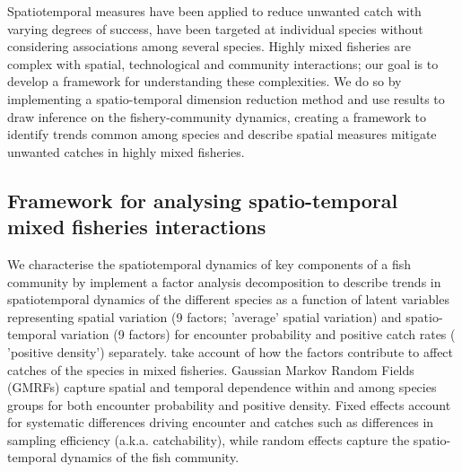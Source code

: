 \documentclass{nature}
\begin{document}
\begin{linenumbers}
Spatiotemporal measures have been applied to reduce unwanted catch with
varying degrees of success\cite{Needle2011, Dunn2014a},   have
been targeted at individual species without considering
associations among several species. Highly mixed
fisheries are complex with spatial, technological and community
interactions;  our goal is to develop a framework for
understanding these complexities. We do so by implementing a spatio-temporal
dimension reduction method and use  results to draw inference on
the fishery-community dynamics, creating a framework to identify trends common
among species  and describe  spatial measures
 mitigate unwanted
catches in highly mixed fisheries.


\subsection{Framework for analysing spatio-temporal mixed fisheries
	interactions}

 We 
characterise the spatiotemporal dynamics of key components of a fish community
by implement a factor analysis decomposition
to describe trends in spatiotemporal dynamics of the different species as a
function of latent variables\cite{Thorson2015} representing spatial variation
(9 factors;  'average' spatial variation) and
spatio-temporal variation (9 factors) for encounter probability and positive
catch rates ( 'positive density')
separately\cite{Thorson2015a}.   take account of how the factors contribute to affect
catches of the species in mixed fisheries. Gaussian Markov
Random Fields (GMRFs) capture spatial and temporal dependence
within and among species groups for both encounter probability and positive
density\cite{Thorson2013}. Fixed effects account for
systematic differences driving encounter and catches\deleted{,} such as
differences in sampling efficiency (a.k.a.  catchability), while random effects
capture the spatio-temporal dynamics of the fish community.


\end{linenumbers}
\end{document}
